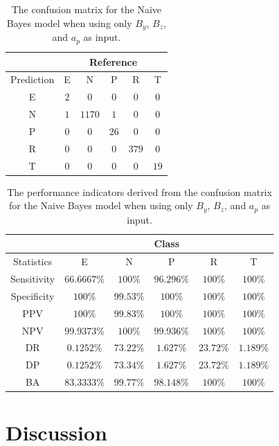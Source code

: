 \documentclass[sn-mathphys-num]{sn-jnl}%
\begin{document}
\begin{table}[!ht]
    \centering
    \caption{The confusion matrix for the Naive Bayes model when using only $B_{y}$, $B_{z}$, and $a_{p}$ as input.}
	\label{tab:cm:yzap:nb}
	\begin{tabular}{|c|c|c|c|c|c|}
		\hline
		 & \multicolumn{5}{|c|}{Reference} \\ \hline
		 Prediction & E & N & P & R & T \\ \hline
		 E & $2$ & $0$ & $0$ & $0$ & $0$ \\ \hline
		 N & $1$ & $1170$ & $1$ & $0$ & $0$ \\ \hline
		 P & $0$ & $0$ & $26$ & $0$ & $0$ \\ \hline
		 R & $0$ & $0$ & $0$ & $379$ & $0$ \\ \hline
		 T & $0$ & $0$ & $0$ & $0$ & $19$ \\ \hline
	\end{tabular}
\end{table}

\begin{table}[!ht]
    \centering
    \caption{The performance indicators derived from the confusion matrix for the Naive Bayes model when using only $B_{y}$, $B_{z}$, and $a_{p}$ as input.}
	\label{tab:cs:reverse:yzap:nb}
	\begin{tabular}{|c|c|c|c|c|c|}
		\hline
		 & \multicolumn{5}{c|}{Class} \\ \hline
		Statistics & E & N & P & R & T \\ \hline
		Sensitivity & $66.6667\%$ & $100\%$ & $96.296\%$ & $100\%$ & $100\%$ \\ \hline
		Specificity & $100\%$ & $99.53\%$ & $100\%$ & $100\%$ & $100\%$ \\ \hline
		PPV & $100\%$ & $99.83\%$ & $100\%$ & $100\%$ & $100\%$ \\ \hline
		NPV & $99.9373\%$ & $100\%$ & $99.936\%$ & $100\%$ & $100\%$ \\ \hline
		DR & $0.1252\%$ & $73.22\%$ & $1.627\%$ & $23.72\%$ & $1.189\%$ \\ \hline
		DP & $0.1252\%$ & $73.34\%$ & $1.627\%$ & $23.72\%$ & $1.189\%$ \\ \hline
		BA & $83.3333\%$ & $99.77\%$ & $98.148\%$ & $100\%$ & $100\%$ \\ \hline
	\end{tabular}
\end{table}

\section{Discussion}
\label{sec:Discussion}
\end{document}
